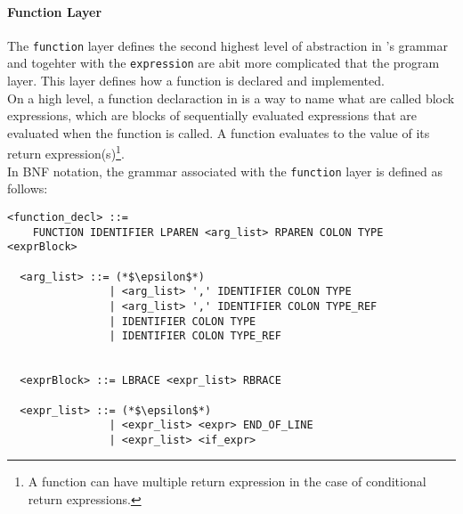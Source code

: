 \paragraph{Function Layer}\hfill 
\vspace{.3em} \hfill

The \texttt{function} layer defines the second highest level of abstraction in 
\lang's grammar and togehter with the \texttt{expression} are abit more complicated
that the program layer. 
This layer defines how a function is declared and implemented. \\

On a high level, a function declaraction in \lang{} is a way to name what are called
block expressions, which are blocks of sequentially evaluated expressions that are
evaluated when the function is called. A function evaluates to the value of its
return expression(s)\footnote{A function can have multiple return expression in the
case of conditional return expressions.}. \\

In BNF notation, the grammar associated with the \texttt{function} layer is defined as follows:

\begin{lstlisting}[caption={Function Layer}, label={lst:FunctionLayer}, frame={single}]
  <function_decl> ::= 
    FUNCTION IDENTIFIER LPAREN <arg_list> RPAREN COLON TYPE <exprBlock>

  <arg_list> ::= (*$\epsilon$*)
                | <arg_list> ',' IDENTIFIER COLON TYPE
                | <arg_list> ',' IDENTIFIER COLON TYPE_REF
                | IDENTIFIER COLON TYPE
                | IDENTIFIER COLON TYPE_REF


  <exprBlock> ::= LBRACE <expr_list> RBRACE

  <expr_list> ::= (*$\epsilon$*)
                | <expr_list> <expr> END_OF_LINE
                | <expr_list> <if_expr>
\end{lstlisting}


